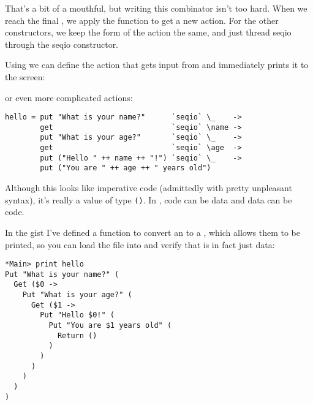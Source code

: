 \documentclass[thesis-solanki.tex]{subfiles}
\begin{document}
That's a bit of a mouthful, but writing this combinator isn't too hard. When we reach the final , we apply the function  to get a 
new action. For the other constructors, we keep the form of the action the same, and just thread seqio through the seqio constructor.

Using  we can define the action that gets input from  and immediately prints it to
the screen: 


or even more complicated actions:

\begin{code-list}[H]
\begin{singlespace}
\begin{verbatim}
hello = put "What is your name?"      `seqio` \_    ->
        get                           `seqio` \name ->
        put "What is your age?"       `seqio` \_    ->
        get                           `seqio` \age  ->
        put ("Hello " ++ name ++ "!") `seqio` \_    ->
        put ("You are " ++ age ++ " years old")
\end{verbatim}
\end{singlespace}
\caption{}
\label{}
\end{code-list}


Although this looks like imperative code (admittedly with pretty unpleasant syntax), it's really a value of type  \Verb!()!. In ,
code can be data and data can be code.

In the gist
 I've defined a function to convert an  to a , which allows them to be printed, so you can load the file into  
and verify that  is in fact just data:

\begin{code-list}[H]
\begin{singlespace}
\begin{verbatim}
*Main> print hello
Put "What is your name?" (
  Get ($0 -> 
    Put "What is your age?" (
      Get ($1 -> 
        Put "Hello $0!" (
          Put "You are $1 years old" (
            Return ()
          )
        )
      )
    )
  )
)
\end{verbatim}
\end{singlespace}
\caption{}
\label{}
\end{code-list}
\end{document}
